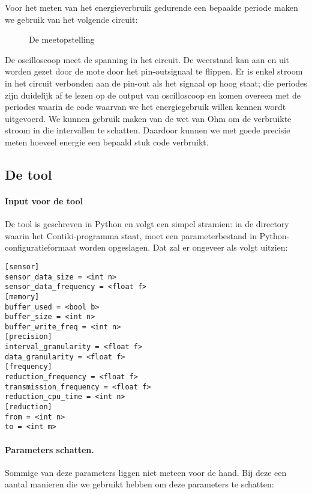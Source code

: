 \documentclass{article}
\begin{document}
Voor het meten van het energieverbruik gedurende een bepaalde periode maken we gebruik van het volgende circuit:

\begin{figure}[h]
\centering
\missingfigure{}
\caption{De meetopstelling}
\label{fig:meetopstelling}
\end{figure}

De oscilloscoop meet de spanning in het circuit. De weerstand kan aan en uit
worden gezet door de mote door het pin-outsignaal te flippen. Er is enkel stroom
in het circuit verbonden aan de pin-out als het signaal op hoog staat; die
periodes zijn duidelijk af te lezen op de output van oscilloscoop en komen
overeen met de periodes waarin de code waarvan we het energiegebruik willen
kennen wordt uitgevoerd. We kunnen gebruik maken van de wet van Ohm om de
verbruikte stroom in die intervallen te schatten. Daardoor kunnen we met goede
precisie meten hoeveel energie een bepaald stuk code verbruikt.

\subsection{De tool}

\paragraph{Input voor de tool}
De tool is geschreven in Python en volgt een simpel stramien: in de directory
waarin het Contiki-programma staat, moet een parameterbestand in
Python-configuratieformaat worden opgeslagen. Dat zal er ongeveer als volgt
uitzien:

\begin{verbatim}
[sensor]
sensor_data_size = <int n>
sensor_data_frequency = <float f>
[memory]
buffer_used = <bool b>
buffer_size = <int n>
buffer_write_freq = <int n>
[precision]
interval_granularity = <float f>
data_granularity = <float f>
[frequency]
reduction_frequency = <float f>
transmission_frequency = <float f>
reduction_cpu_time = <int n>
[reduction]
from = <int n>
to = <int m>
\end{verbatim}

\paragraph{Parameters schatten.} Sommige van deze parameters liggen niet meteen
voor de hand. Bij deze een aantal manieren die we gebruikt hebben om deze
parameters te schatten:
\end{document}

